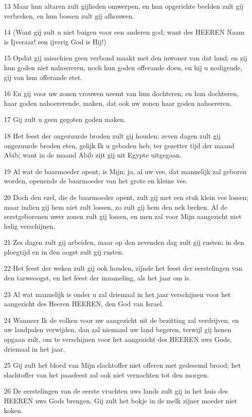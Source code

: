\par 13 Maar hun altaren zult gijlieden omwerpen, en hun opgerichte beelden zult gij verbreken, en hun bossen zult gij afhouwen.
\par 14 (Want gij zult u niet buigen voor een anderen god; want des HEEREN Naam is Ijveraar! een ijverig God is Hij!)
\par 15 Opdat gij misschien geen verbond maakt met den inwoner van dat land; en zij hun goden niet nahoereren, noch hun goden offerande doen, en hij u nodigende, gij van hun offerande etet.
\par 16 En gij voor uw zonen vrouwen neemt van hun dochteren; en hun dochteren, haar goden nahoererende, maken, dat ook uw zonen haar goden nahoereren.
\par 17 Gij zult u geen gegoten goden maken.
\par 18 Het feest der ongezuurde broden zult gij houden; zeven dagen zult gij ongezuurde broden eten, gelijk Ik u geboden heb, ter gezetter tijd der maand Abib; want in de maand Abib zijt gij uit Egypte uitgegaan.
\par 19 Al wat de baarmoeder opent, is Mijn; ja, al uw vee, dat mannelijk zal geboren worden, openende de baarmoeder van het grote en kleine vee.
\par 20 Doch den ezel, die de baarmoeder opent, zult gij met een stuk klein vee lossen; maar indien gij hem niet zult lossen, zo zult gij hem den nek breken. Al de eerstgeborenen uwer zonen zult gij lossen, en men zal voor Mijn aangezicht niet ledig verschijnen.
\par 21 Zes dagen zult gij arbeiden, maar op den zevenden dag zult gij rusten; in den ploegtijd en in den oogst zult gij rusten.
\par 22 Het feest der weken zult gij ook houden, zijnde het feest der eerstelingen van den tarweoogst, en het feest der inzameling, als het jaar om is.
\par 23 Al wat mannelijk is onder u zal driemaal in het jaar verschijnen voor het aangezicht des Heeren HEEREN, den God van Israel.
\par 24 Wanneer Ik de volken voor uw aangezicht uit de bezitting zal verdrijven, en uw landpalen verwijden, dan zal niemand uw land begeren, terwijl gij henen opgaan zult, om te verschijnen voor het aangezicht des HEEREN uws Gods, driemaal in het jaar.
\par 25 Gij zult het bloed van Mijn slachtoffer niet offeren met gedesemd brood; het slachtoffer van het paasfeest zal ook niet vernachten tot den morgen.
\par 26 De eerstelingen van de eerste vruchten uws lands zult gij in het huis des HEEREN uws Gods brengen. Gij zult het bokje in de melk zijner moeder niet koken.
